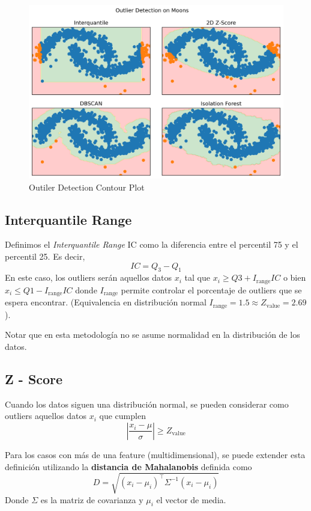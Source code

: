 \begin{figure}[H]
    \center
    \includegraphics[scale=0.55]{notebooks/Others/img/outlier_detection.png}
    \caption{Outiler Detection Contour Plot}
\end{figure}

\subsection{Interquantile Range}

Definimos el \textit{Interquantile Range} IC como la diferencia entre el percentil 75 y el percentil 25. Es decir, 
$$ 
IC = Q_3 - Q_1
$$
En este caso, los outliers serán aquellos datos $x_i$ tal que 
$x_i \geq Q3 + I_{\text{range}}IC$ o bien $x_i \leq Q1 - I_{\text{range}}IC$
donde $ I_{\text{range}}$ permite controlar el porcentaje de outliers que se espera encontrar. (Equivalencia en distribución normal $I_{\text{range}} = 1.5 \approx Z_{\text{value}} = 2.69$).

Notar que en esta metodología no se asume normalidad en la distribución de los datos. 

\subsection{Z - Score}

Cuando los datos siguen una distribución normal, se pueden considerar como outliers aquellos datos $x_i$ que cumplen 
$$\left | \frac{x_i - \mu}{\sigma}\right | \geq Z_{\text{value}}$$

Para los casos con más de una feature (multidimensional), se puede extender esta definición utilizando la \textbf{distancia de Mahalanobis} definida como 
$$
D = \sqrt{(x_i - \mu_i)^{\top}\Sigma^{-1}(x_i - \mu_i)}
$$
Donde $\Sigma$ es la matriz de covarianza y $\mu_i$ el vector de media. 

